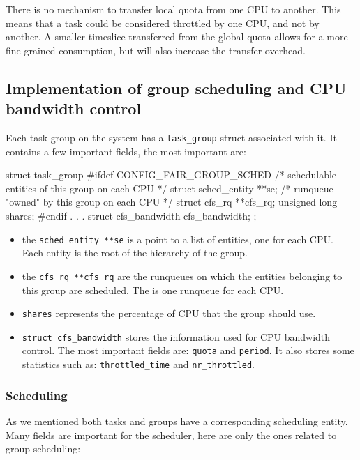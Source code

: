 There is no mechanism to transfer local quota from one CPU to another. This means that a task could be considered throttled by one CPU, and not by another. A smaller timeslice transferred from the global quota allows for a more fine-grained consumption, but will also increase the transfer overhead. %

\subsection{Implementation of group scheduling and CPU bandwidth control}

Each task group on the system has a \verb|task_group| struct associated with it. It contains a few important fields, the most important are:
\begin{code}
struct task_group {
	#ifdef CONFIG_FAIR_GROUP_SCHED
	/* schedulable entities of this group on each CPU */
	struct sched_entity	**se;
	/* runqueue "owned" by this group on each CPU */
	struct cfs_rq		**cfs_rq;
	unsigned long		shares;
	#endif
	.
	.
	.
	struct cfs_bandwidth	cfs_bandwidth;
};
\end{code}

\begin{itemize}
    \item the \verb|sched_entity **se| is a point to a list of entities, one for each CPU. Each entity is the root of the hierarchy of the group. 
    \item the \verb|cfs_rq **cfs_rq| are the runqueues on which the entities belonging to this group are scheduled. The is one runqueue for each CPU.
    \item \verb|shares| represents the percentage of CPU that the group should use. %
    \item \verb|struct cfs_bandwidth| stores the information used for CPU bandwidth control. The most important fields are: \verb|quota| and \verb|period|. It also stores some statistics such as: \verb|throttled_time| and \verb|nr_throttled|.
\end{itemize}

\subsubsection{Scheduling}

As we mentioned both tasks and groups have a corresponding scheduling entity. Many fields are important for the scheduler, here are only the ones related to group scheduling:

